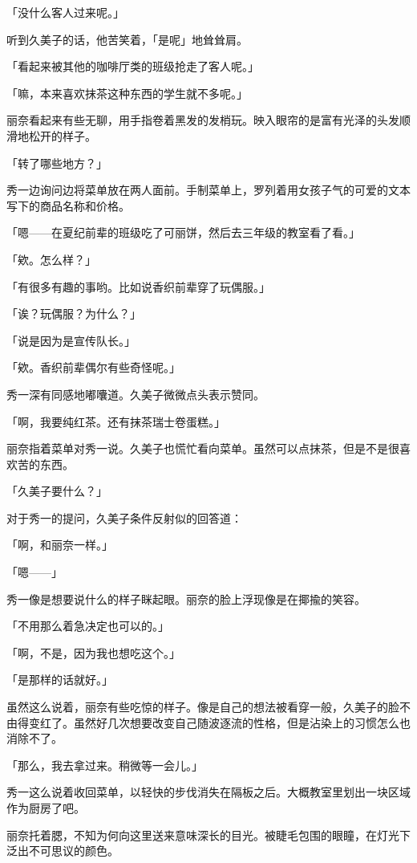 \documentclass[UTF8]{ctexart}
\begin{document}
    「没什么客人过来呢。」

    听到久美子的话，他苦笑着，「是呢」地耸耸肩。

    「看起来被其他的咖啡厅类的班级抢走了客人呢。」

    「嘛，本来喜欢抹茶这种东西的学生就不多呢。」

    丽奈看起来有些无聊，用手指卷着黑发的发梢玩。映入眼帘的是富有光泽的头发顺滑地松开的样子。

    「转了哪些地方？」

    秀一边询问边将菜单放在两人面前。手制菜单上，罗列着用女孩子气的可爱的文本写下的商品名称和价格。

    「嗯——在夏纪前辈的班级吃了可丽饼，然后去三年级的教室看了看。」

    「欸。怎么样？」

    「有很多有趣的事哟。比如说香织前辈穿了玩偶服。」

    「诶？玩偶服？为什么？」

    「说是因为是宣传队长。」

    「欸。香织前辈偶尔有些奇怪呢。」

    秀一深有同感地嘟囔道。久美子微微点头表示赞同。

    「啊，我要纯红茶。还有抹茶瑞士卷蛋糕。」

    丽奈指着菜单对秀一说。久美子也慌忙看向菜单。虽然可以点抹茶，但是不是很喜欢苦的东西。

    「久美子要什么？」

    对于秀一的提问，久美子条件反射似的回答道：

    「啊，和丽奈一样。」

    「嗯——」

    秀一像是想要说什么的样子眯起眼。丽奈的脸上浮现像是在揶揄的笑容。

    「不用那么着急决定也可以的。」

    「啊，不是，因为我也想吃这个。」

    「是那样的话就好。」

    虽然这么说着，丽奈有些吃惊的样子。像是自己的想法被看穿一般，久美子的脸不由得变红了。虽然好几次想要改变自己随波逐流的性格，但是沾染上的习惯怎么也消除不了。

    「那么，我去拿过来。稍微等一会儿。」

    秀一这么说着收回菜单，以轻快的步伐消失在隔板之后。大概教室里划出一块区域作为厨房了吧。

    丽奈托着腮，不知为何向这里送来意味深长的目光。被睫毛包围的眼瞳，在灯光下泛出不可思议的颜色。
\end{document}
